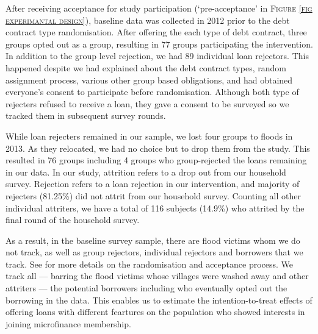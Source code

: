 	After receiving acceptance for study participation (`pre-acceptance' in \textsc{\normalsize Figure \ref{fig experimantal design}}), baseline data was collected in 2012 prior to the debt contract type randomisation. After offering the each type of debt contract, three groups opted out as a group, resulting in 77 groups participating the intervention. In addition to the group level rejection, we had 89 individual loan rejectors. This happened despite we had explained about the debt contract types, random assignment process, various other group based obligations, and had obtained everyone's consent to participate before randomisation. Although both type of rejecters refused to receive a loan, they gave a consent to be surveyed so we tracked them in subsequent survey rounds.

	While loan rejecters remained in our sample, we lost four groups to floods in 2013. As they relocated, we had no choice but to drop them from the study. This resulted in 76 groups including 4 groups who group-rejected the loans remaining in our data. In our study, attrition refers to a drop out from our household survey. Rejection refers to a loan rejection in our intervention, and majority of rejecters (81.25\%) did not attrit from our household survey. Counting all other individual attriters, we have a total of 116 subjects (14.9\%) who attrited by the final round of the household survey. 

	As a result, in the baseline survey sample, there are flood victims whom we do not track, as well as group rejectors, individual rejectors and borrowers that we track. See \citet{GUK2016} for more details on the randomisation and acceptance process. We track all --- barring the flood victims whose villages were washed away and other attriters --- the potential borrowers including who eventually opted out the borrowing in the data. This enables us to estimate the intention-to-treat effects of offering loans with different feartures on the population who showed interests in joining microfinance membership. 

